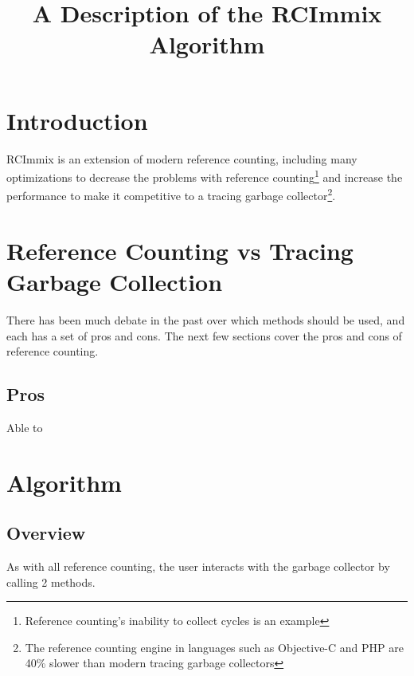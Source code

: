 \documentclass{article}
\title{A Description of the RCImmix Algorithm}
\begin{document}
\section{Introduction}

RCImmix is an extension of modern reference counting, including many optimizations to decrease the problems with reference counting\footnote{Reference counting's inability to collect cycles is an example} and increase the performance to make it competitive to a tracing garbage collector\footnote{The reference counting engine in languages such as Objective-C and PHP are 40\% slower than modern tracing garbage collectors}.

\section{Reference Counting vs Tracing Garbage Collection}

There has been much debate in the past over which methods should be used, and each has a set of pros and cons. The next few sections cover the pros and cons of reference counting.

\subsection{Pros}

Able to 


\section{Algorithm}

\subsection{Overview}

As with all reference counting, the user interacts with the garbage collector by calling 2 methods.
\end{document}
